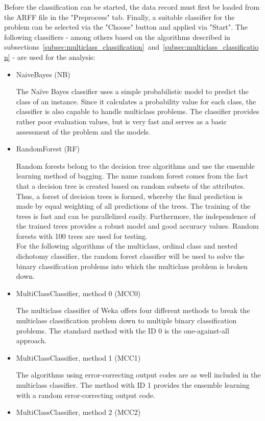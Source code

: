\documentclass[article,type=msc,colorback,accentcolor=tud7b]{tudthesis}
\begin{document}
    Before the classification can be started, the data record must first be loaded from the ARFF file in the "Preprocess" tab. Finally, a suitable classifier for the problem can be selected via the "Choose" button and applied via "Start". The following classifiers - among others based on the algorithms described in subsections~\ref{subsec:multiclass_classification}~and~\ref{subsec:multiclass_classification} - are used for the analysis:
    \begin{itemize}
      \item NaiveBayes (NB)

        The Naïve Bayes classifier uses a simple probabilistic model to predict the class of an instance. Since it calculates a probability value for each class, the classifier is also capable to handle multiclass problems. The classifier provides rather poor evaluation values, but is very fast and serves as a basic assessment of the problem and the models.
      \item RandomForest (RF)

        Random forests belong to the decision tree algorithms and use the ensemble learning method of bagging. The name random forest comes from the fact that a decision tree is created based on random subsets of the attributes. Thus, a forest of decision trees is formed, whereby the final prediction is made by equal weighting of all predictions of the trees. The training of the trees is fast and can be parallelized easily. Furthermore, the independence of the trained trees provides a robust model and good accuracy values. Random forests with 100 trees are used for testing. \\
For the following algorithms of the multiclass, ordinal class and nested dichotomy classifier, the random forest classifier will be used to solve the binary classification problems into which the multiclass problem is broken down.
      \item MultiClassClassifier, method 0 (MCC0)

        The multiclass classifier of Weka offers four different methods to break the multiclass classification problem down to multiple binary classification problems. The standard method with the ID 0 is the one-against-all approach.
      \item MultiClassClassifier, method 1 (MCC1)

        The algorithms using error-correcting output codes are as well included in the multiclass classifier. The method with ID 1 provides the ensemble learning with a random error-correcting output code.
      \item MultiClassClassifier, method 2 (MCC2)


\end{itemize}
\end{document}
